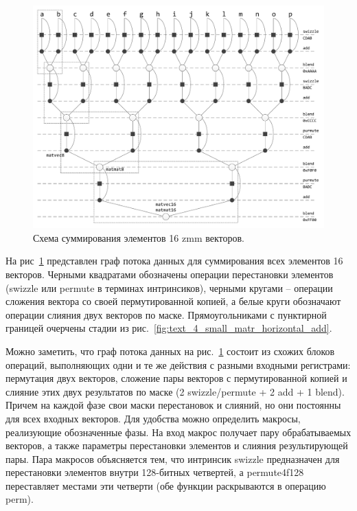 \begin{figure}[ht]
\centering
\includegraphics[width=1.0\textwidth]{./fig/vec_horizontal_add_operations_tree.pdf}
\singlespacing
{}\caption{Схема суммирования элементов 16 zmm векторов.}
\label{fig:text_4_small_matr_operations_tree}
\end{figure}

На рис~\ref{fig:text_4_small_matr_operations_tree} представлен граф потока данных для суммирования всех элементов 16 векторов.
Черными квадратами обозначены операции перестановки элементов (swizzle или permute в терминах интринсиков), черными кругами -- операции сложения вектора со своей пермутированной копией, а белые круги обозначают операции слияния двух векторов по маске.
Прямоугольниками с пунктирной границей очерчены стадии из рис.~\ref{fig:text_4_small_matr_horizontal_add}.

Можно заметить, что граф потока данных на рис.~\ref{fig:text_4_small_matr_operations_tree} состоит из схожих блоков операций, выполняющих одни и те же действия с разными входными регистрами: пермутация двух векторов, сложение пары векторов с пермутированной копией и слияние этих двух результатов по маске (2 swizzle/permute + 2 add + 1 blend).
Причем на каждой фазе свои маски перестановок и слияний, но они постоянны для всех входных векторов.
Для удобства можно определить макросы, реализующие обозначенные фазы.
На вход макрос получает пару обрабатываемых векторов, а также параметры перестановки элементов и слияния результирующей пары.
Пара макросов объясняется тем, что интринсик swizzle предназначен для перестановки элементов внутри 128-битных четвертей, а permute4f128 переставляет местами эти четверти (обе функции раскрываются в операцию perm).

